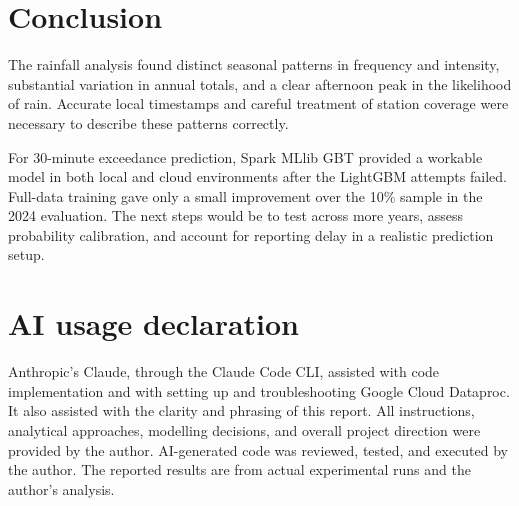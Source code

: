 \documentclass[11pt]{article}
\begin{document}
\section{Conclusion}

The rainfall analysis found distinct seasonal patterns in frequency and intensity, substantial variation in annual totals, and a clear afternoon peak in the likelihood of rain. Accurate local timestamps and careful treatment of station coverage were necessary to describe these patterns correctly.

For 30-minute exceedance prediction, Spark MLlib GBT provided a workable model in both local and cloud environments after the LightGBM attempts failed. Full-data training gave only a small improvement over the 10\% sample in the 2024 evaluation. The next steps would be to test across more years, assess probability calibration, and account for reporting delay in a realistic prediction setup.

\section{AI usage declaration}

Anthropic's Claude, through the Claude Code CLI, assisted with code implementation and with setting up and troubleshooting Google Cloud Dataproc. It also assisted with the clarity and phrasing of this report. All instructions, analytical approaches, modelling decisions, and overall project direction were provided by the author. AI-generated code was reviewed, tested, and executed by the author. The reported results are from actual experimental runs and the author's analysis.
\end{document}
